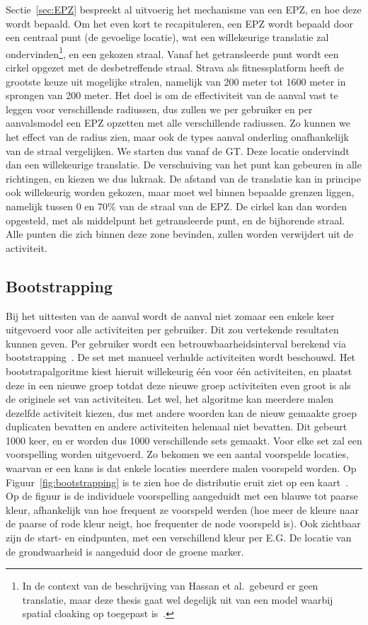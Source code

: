 Sectie~\ref{sec:EPZ} bespreekt al uitvoerig het mechanisme van een \ac{EPZ}, en
hoe deze wordt bepaald. Om het even kort te recapituleren, een \ac{EPZ} wordt
bepaald door een centraal punt (de gevoelige locatie), wat een willekeurige
translatie zal ondervinden\footnote{In de context van de beschrijving van
    Hassan et al.\ gebeurd er geen translatie, maar deze thesis gaat wel degelijk
    uit van een model waarbij spatial cloaking op toegepast
    is~\cite{sec18has3:online}.}, en een gekozen straal. Vanaf het getransleerde
punt wordt een cirkel opgezet met de desbetreffende straal. Strava als
fitnessplatform heeft de grootste keuze uit mogelijke stralen, namelijk van 200
meter tot 1600 meter in sprongen van 200 meter. Het doel is om de effectiviteit
van de aanval vast te leggen voor verschillende radiussen, dus zullen we per
gebruiker en per aanvalsmodel een \ac{EPZ} opzetten met alle verschillende
radiussen. Zo kunnen we het effect van de radius zien, maar ook de types aanval
onderling onafhankelijk van de straal vergelijken. We starten dus vanaf de
\ac{GT}. Deze locatie ondervindt dan een willekeurige translatie. De
verschuiving van het punt kan gebeuren in alle richtingen, en kiezen we dus
lukraak. De afstand van de translatie kan in principe ook willekeurig worden
gekozen, maar moet wel binnen bepaalde grenzen liggen, namelijk tussen 0 en
70\% van de straal van de \ac{EPZ}. De cirkel kan dan worden opgesteld, met als
middelpunt het getransleerde punt, en de bijhorende straal. Alle punten die
zich binnen deze zone bevinden, zullen worden verwijdert uit de activiteit.

\subsection{Bootstrapping}
Bij het uittesten van de aanval wordt de aanval niet zomaar een enkele keer
uitgevoerd voor alle activiteiten per gebruiker. Dit zou vertekende resultaten
kunnen geven. Per gebruiker wordt een betrouwbaarheidsinterval berekend via
bootstrapping~\cite{Dhondt, Verdonck_2022}. De set met manueel verhulde
activiteiten wordt beschouwd. Het bootstrapalgoritme kiest hieruit willekeurig
één voor één activiteiten, en plaatst deze in een nieuwe groep totdat deze
nieuwe groep activiteiten even groot is als de originele set van activiteiten.
Let wel, het algoritme kan meerdere malen dezelfde activiteit kiezen, dus met
andere woorden kan de nieuw gemaakte groep duplicaten bevatten en andere
activiteiten helemaal niet bevatten. Dit gebeurt 1000 keer, en er worden dus
1000 verschillende sets gemaakt. Voor elke set zal een voorspelling worden
uitgevoerd. Zo bekomen we een aantal voorspelde locaties, waarvan er een kans
is dat enkele locaties meerdere malen voorspeld worden. Op
Figuur~\ref{fig:bootstrapping} is te zien hoe de distributie eruit ziet op een
kaart~\cite{Verdonck_2022}. Op de figuur is de individuele voorspelling
aangeduidt met een blauwe tot paarse kleur, afhankelijk van hoe frequent ze
voorspeld werden (hoe meer de kleure naar de paarse of rode kleur neigt, hoe
frequenter de node voorspeld is). Ook zichtbaar zijn de start- en eindpunten,
met een verschillend kleur per \ac{E.G.} De locatie van de grondwaarheid is
aangeduid door de groene marker.

